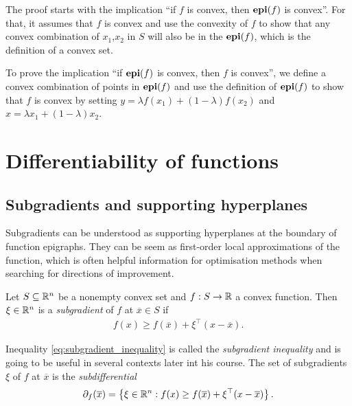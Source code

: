 The proof starts with the implication ``if $f$ is convex, then $\mathop{\bf epi}(f)$ is convex''. For that, it assumes that $f$ is convex and use the convexity of $f$ to show that any convex combination of $x_1$,$x_2$ in $S$ will also be in the $\mathop{\bf epi}(f)$, which is the definition of a convex set.

To prove the implication ``if $\mathop{\bf epi}(f)$ is convex, then $f$ is convex'', we define a convex combination of points in $\mathop{\bf epi}(f)$ and use the definition of $\mathop{\bf epi}(f)$ to show that $f$ is convex by setting $y = \lambda f(x_1) + (1 - \lambda)f(x_2)$ and $x = \lambda x_1 + (1-\lambda)x_2$.


\section{Differentiability of functions}


\subsection{Subgradients and supporting hyperplanes}


Subgradients can be understood as supporting hyperplanes at the boundary of function epigraphs. They can be seem as first-order local approximations of the function, which is often helpful information for optimisation methods when searching for directions of improvement.
%
\begin{definition}[Subgradients]
	Let $S \subseteq \mathbb{R}^n$ be a nonempty convex set and $f:S \to \mathbb{R}$ a convex function. Then $\xi\in \mathbb{R}^n$ is a \emph{subgradient} of $f$ at $\overline{x} \in S$ if
	\begin{align} 
	f(x) \geq f(\overline{x}) + \xi^\top(x - \overline{x}). \label{eq:subgradient_inequality}
	\end{align}
\end{definition}
%
Inequality \eqref{eq:subgradient_inequality} is called the \emph{subgradient inequality} and is going to be useful in several contexts later int his course. The set of subgradients $\xi$ of $f$ at $\overline{x}$ is the \emph{subdifferential} 
	$$
	\partial_f(\overline{x}) = \left\{ \xi \in \mathbb{R}^n : f(x) \geq f(\overline{x}) + \xi^\top(x - \overline{x}) \right \}.
	$$ 

